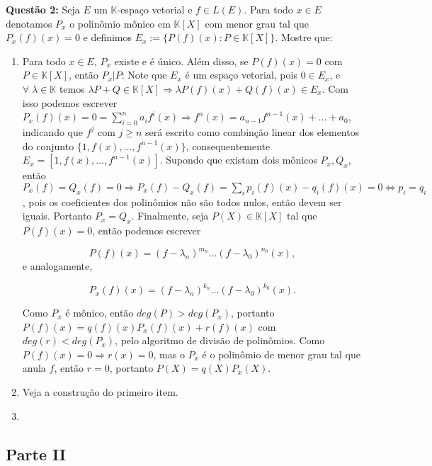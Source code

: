 \documentclass{article}
\begin{document}
\textbf{Questão 2:} Seja $E$ um $\mathbb K$-espaço vetorial e $f \in L(E)$. Para todo $x \in E$ denotamos $P_x$ o polinômio mônico em $\mathbb K[X]$ com menor
grau tal que $P_x(f)(x)=0$ e definimos $E_x := \{P(f)(x): P \in \mathbb
K[X]\}$. Mostre que:

\begin{enumerate}[label=(\alph*)]
  \item Para todo $x \in E$, $P_x$ existe e é único. Além disso, se $P(f)(x)=0$
  com $P \in \mathbb K[X]$, então $P_x|P$: Note que $E_x$ é um espaço vetorial,
  pois $0 \in E_x$, e $\forall \; \lambda \in \mathbb K$ temos $\lambda P + Q
  \in \mathbb K[X] \Rightarrow \lambda P(f)(x) + Q(f)(x)
  \in E_x$. Com isso podemos escrever $P_x(f)(x) = 0 = \sum_{i = 0}^{n}
  a_if^i(x) \Rightarrow f^n(x) =a_{n-1}f^{n-1}(x) + \dots +a_0$, indicando que $f^j$ com $j\geq n$
  será escrito como combinção linear dos elementos do conjunto $\{1, f(x),
  \dots, f^{n-1}(x)\}$, consequentemente $E_x = [1, f(x), \dots, f^{n-1}(x)]$.
  Supondo que existam dois mônicos $P_x, Q_x$, então $P_x(f) = Q_x(f) = 0
  \Rightarrow P_x(f) - Q_x(f) = \sum_i p_i(f)(x) - q_i(f)(x) = 0 \iff p_i =
  q_i$, pois os coeficientes dos polinômios não são todos nulos, então devem
  ser iguais. Portanto $P_x = Q_x$. Finalmente, seja $P(X) \in \mathbb K[X]$ tal
  que $P(f)(x)=0 $, então podemos escrever 
  
	$$P(f)(x) = (f - \lambda_n)^{m_n}\dots(f - \lambda_0)^{n_0}(x),$$ 
  e analogamente, 
  
  $$P_x(f)(x) = (f - \lambda_n)^{k_n}\dots(f - \lambda_0)^{k_0}(x).$$
  
  Como $P_x$ é mônico, então $deg(P) > deg(P_x)$, portanto $P(f)(x) =
  q(f)(x)P_x(f)(x) + r(f)(x)$ com $deg(r) < deg(P_x)$, pelo algoritmo de divisão
  de polinômios. Como $P(f)(x) =0 \Rightarrow r(x) = 0$, mas o $P_x$ é o
  polinômio de menor grau tal que anula $f$, então $r=0$, portanto $P(X) =
  q(X)P_x(X)$.
  
  \item Veja a construção do primeiro item.
  
  \item 
\end{enumerate}

\subsection{Parte II}
\end{document}
